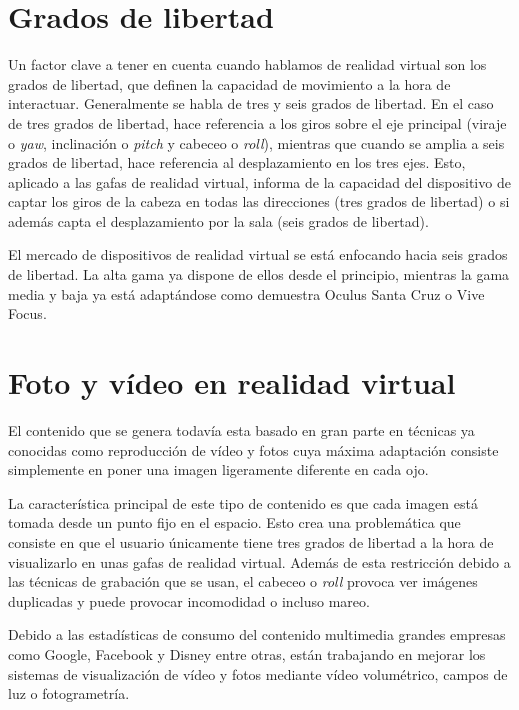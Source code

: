 \section{Grados de libertad}
Un factor clave a tener en cuenta cuando hablamos de realidad virtual son los grados de libertad, que definen la capacidad de movimiento a la hora de interactuar. Generalmente se habla de tres y seis grados de libertad. En el caso de tres grados de libertad, hace referencia a los giros sobre el eje principal (viraje o \textit{yaw}, inclinación o \textit{pitch} y cabeceo o \textit{roll}), mientras que cuando se amplia a seis grados de libertad, hace referencia al desplazamiento en los tres ejes. Esto, aplicado a las gafas de realidad virtual, informa de la capacidad del dispositivo de captar los giros de la cabeza en todas las direcciones (tres grados de libertad) o si además capta el desplazamiento por la sala (seis grados de libertad).

El mercado de dispositivos de realidad virtual se está enfocando hacia seis grados de libertad. La alta gama ya dispone de ellos desde el principio, mientras la gama media y baja ya está adaptándose como demuestra Oculus Santa Cruz o Vive Focus.

\section{Foto y vídeo en realidad virtual}
El contenido que se genera todavía esta basado en gran parte en técnicas ya conocidas como reproducción de vídeo y fotos cuya máxima adaptación consiste simplemente en poner una imagen ligeramente diferente en cada ojo.

La característica principal de este tipo de contenido es que cada imagen está tomada desde un punto fijo en el espacio. Esto crea una problemática que consiste en que el usuario únicamente tiene tres grados de libertad a la hora de visualizarlo en unas gafas de realidad virtual. Además de esta restricción debido a las técnicas de grabación que se usan, el cabeceo o \textit{roll} provoca ver imágenes duplicadas y puede provocar incomodidad o incluso mareo.

Debido a las estadísticas de consumo del contenido multimedia grandes empresas como Google, Facebook y Disney entre otras, están trabajando en mejorar los sistemas de visualización de vídeo y fotos mediante vídeo volumétrico, campos de luz o fotogrametría.


